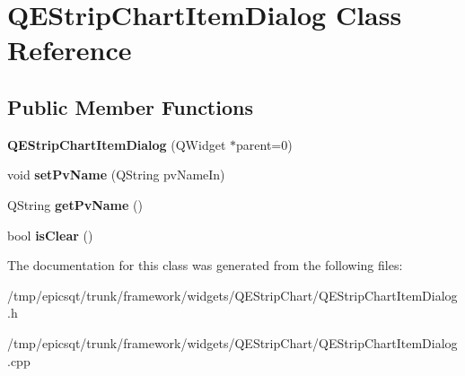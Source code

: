 \hypertarget{classQEStripChartItemDialog}{
\section{QEStripChartItemDialog Class Reference}
\label{classQEStripChartItemDialog}
}
\subsection*{Public Member Functions}
\begin{DoxyCompactItemize}
\item 
\hypertarget{classQEStripChartItemDialog_af845f42a04f495da4e1412a3cffb4cf5}{
{\bfseries QEStripChartItemDialog} (QWidget $\ast$parent=0)}
\label{classQEStripChartItemDialog_af845f42a04f495da4e1412a3cffb4cf5}

\item 
\hypertarget{classQEStripChartItemDialog_a2af8cdf2bb89e447ec82eed3bb734015}{
void {\bfseries setPvName} (QString pvNameIn)}
\label{classQEStripChartItemDialog_a2af8cdf2bb89e447ec82eed3bb734015}

\item 
\hypertarget{classQEStripChartItemDialog_a62717629a151661575d46dee7c1e76da}{
QString {\bfseries getPvName} ()}
\label{classQEStripChartItemDialog_a62717629a151661575d46dee7c1e76da}

\item 
\hypertarget{classQEStripChartItemDialog_a33274817a0fcc224d9dfedf7d1a3bfce}{
bool {\bfseries isClear} ()}
\label{classQEStripChartItemDialog_a33274817a0fcc224d9dfedf7d1a3bfce}

\end{DoxyCompactItemize}


The documentation for this class was generated from the following files:\begin{DoxyCompactItemize}
\item 
/tmp/epicsqt/trunk/framework/widgets/QEStripChart/QEStripChartItemDialog.h\item 
/tmp/epicsqt/trunk/framework/widgets/QEStripChart/QEStripChartItemDialog.cpp\end{DoxyCompactItemize}
